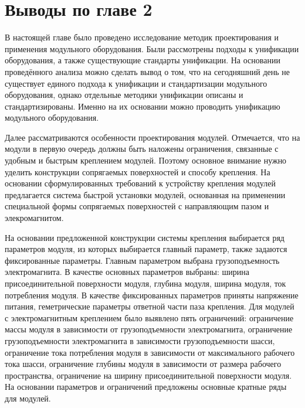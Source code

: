 %

\section{Выводы по главе 2}

В настоящей главе было проведено исследование методик проектирования и применения модульного оборудования. Были рассмотрены подходы к унификации оборудования, а также существующие стандарты унификации. На основании проведённого анализа можно сделать вывод о том, что на сегодняшний день не существует единого подхода к унификации и стандартизации модульного оборудования, однако отдельные методики унификации описаны и стандартизированы. Именно на их основании можно проводить унификацию модульного оборудования. 

Далее рассматриваются особенности проектирования модулей. Отмечается, что на модули в первую очередь должны быть наложены ограничения, связанные с удобным и быстрым креплением модулей. Поэтому основное внимание нужно уделить конструкции сопрягаемых поверхностей и способу крепления. На основании сформулированных требований к устройству крепления модулей предлагается система быстрой установки модулей, основанная на применении специальной формы сопрягаемых поверхностей с направляющим пазом и элекромагнитом.

На основании предложенной конструкции системы крепления выбирается ряд параметров модуля, из которых выбирается главный параметр, также задаются фиксированные параметры. Главным параметром выбрана грузоподъемность электромагнита. В качестве основных параметров выбраны: ширина присоединительной поверхности модуля, глубина модуля, ширина модуля, ток потребления модуля. В качестве фиксированных параметров приняты напряжение питания, геметрические параметры ответной части паза крепления. Для модулей с электромагнитным креплением было выявлено пять ограничений: ограничение массы модуля в зависимости от грузоподъемности электромагнита, ограничение грузоподъемности электромагнита в зависимости грузоподъемности шасси, ограничение тока потребления модуля в зависимости от максимального рабочего тока шасси, ограничение глубины модуля в зависимости от размера рабочего пространства, ограничение на ширину присоединительной поверхности модуля. На основании параметров и ограничений предложены основные кратные ряды для модулей.

